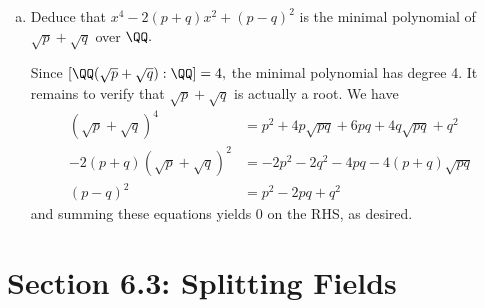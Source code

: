 \documentclass{article}
\begin{document}
\begin{itemize}
\begin{enumerate}[(a)]
			\item Deduce that $x^4-2(p+q)x^2+(p-q)^2$ is the minimal polynomial of $\sqrt{p}+\sqrt{q}$ over $\QQ.$
				\begin{soln}
					Since $[\QQ(\sqrt{p}+\sqrt{q}):\QQ]=4,$ the minimal polynomial has degree 4. It remains to verify that $\sqrt{p}+\sqrt{q}$ is actually a root. We have
					\begin{align*}
						(\sqrt{p}+\sqrt{q})^4 &= p^2+4p\sqrt{pq}+6pq+4q\sqrt{pq}+q^2 \\
						-2(p+q)(\sqrt{p}+\sqrt{q})^2 &= -2p^2-2q^2-4pq-4(p+q)\sqrt{pq} \\
						(p-q)^2 &= p^2-2pq+q^2
					\end{align*}
					and summing these equations yields 0 on the RHS, as desired.
				\end{soln}
				
		\end{enumerate}
		
\end{itemize}

\section*{Section 6.3: Splitting Fields}
\end{document}
